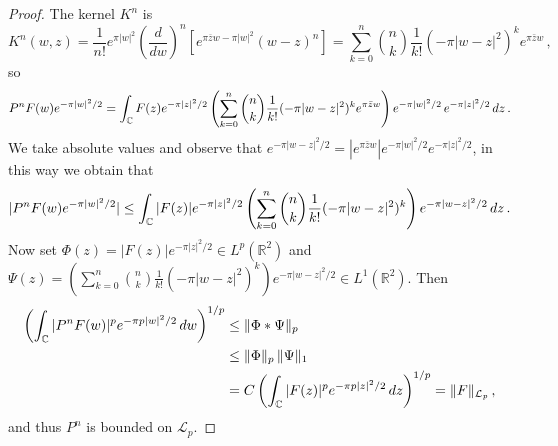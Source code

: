 \documentclass[12pt]{amsart}
\theoremstyle{plain}
\numberwithin{equation}{section}
\begin{document}
\begin{proof}
The kernel $K^{n}$ is 
\begin{equation*}
K^{n}(w,z)=\frac{1}{n!}e^{\pi \left\vert w\right\vert ^{2}}\left( \frac{d}{dw%
}\right) ^{n}\left[ e^{\pi \overline{z}w-\pi \left\vert w\right\vert
^{2}}(w-z)^{n}\right] =\sum_{k=0}^{n}\binom{n}{k}\frac{1}{k!}(-\pi
|w-z|^{2})^{k}e^{\pi \bar{z}w}\,,
\end{equation*}%
so 
\begin{equation*}
P^{n}F(w)e^{-\pi |w|^{2}/2}=\int_{%
\mathbb{C}
}F(z)e^{-\pi |z|^{2}/2}\left( \sum_{k=0}^{n}\binom{n}{k}\frac{1}{k!}(-\pi
|w-z|^{2})^{k}e^{\pi \bar{z}w}\right) e^{-\pi |w|^{2}/2}\,e^{-\pi
|z|^{2}/2}\,dz\,.
\end{equation*}%
We take absolute values and observe that $e^{-\pi |w-z|^{2}/2}=|e^{\pi \bar{z%
}w}|e^{-\pi |w|^{2}/2}e^{-\pi |z|^{2}/2}$, in this way we obtain that 
\begin{equation*}
|P^{n}F(w)e^{-\pi |w|^{2}/2}|\leq \int_{%
\mathbb{C}
}|F(z)|e^{-\pi |z|^{2}/2}\left( \sum_{k=0}^{n}\binom{n}{k}\frac{1}{k!}(-\pi
|w-z|^{2})^{k}\right) e^{-\pi |w-z|^{2}/2}\,dz\, .
\end{equation*}%
Now set $\Phi (z)=|F(z)|e^{-\pi |z|^{2}/2}\in L^{p}(%
\mathbb{R}
^{2})$ and $\Psi (z)=\left( \sum_{k=0}^{n}\binom{n}{k}\frac{1}{k!}(-\pi
|w-z|^{2})^{k}\right) e^{-\pi |w-z|^{2}/2}\in L^{1}(%
\mathbb{R}
^{2})$. Then 
\begin{align}
\left( \int_{%
\mathbb{C}
}|P^{n}F(w)|^{p}e^{-\pi p|w|^{2}/2}\,dw\right) ^{1/p}& \leq \Vert \Phi \ast
\Psi \Vert _{p}  \notag \\
& \leq \Vert \Phi \Vert _{p}\,\Vert \Psi \Vert _{1}  \notag \\
& =C\left( \int_{%
\mathbb{C}
}|F(z)|^{p}e^{-\pi p|z|^{2}/2}\,dz\right) ^{1/p}=\Vert F\Vert _{\mathcal{L}%
_{p}}\,,  \label{boundt}
\end{align}%
and thus $P^{n}$ is bounded on $\mathcal{L}_{p}$.


\end{proof}
\end{document}
